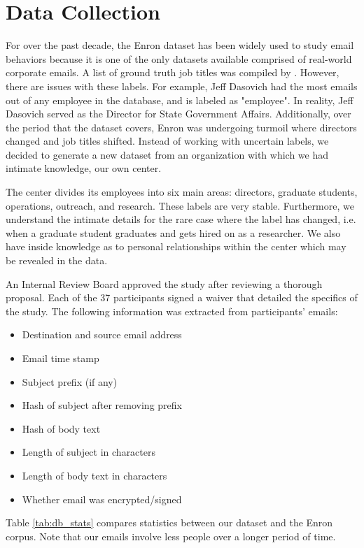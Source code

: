 \documentclass{article}
\begin{document}
\section{Data Collection} \label{Data Collection}
For over the past decade, the Enron dataset has been widely used to study email behaviors because it is one of the only datasets available comprised of real-world corporate emails.  A list of ground truth job titles was compiled by \cite{shetty_status_2004}.  However, there are issues with these labels.  For example, Jeff Dasovich had the most emails out of any employee in the database, and is labeled as "employee".  In reality, Jeff Dasovich served as the Director for State Government Affairs. Additionally, over the period that the dataset covers, Enron was undergoing turmoil where directors changed and job titles shifted.  Instead of working with uncertain labels, we decided to generate a new dataset from an organization with which we had intimate knowledge, our own center.  
\par
The center divides its employees into six main areas: directors, graduate students, operations, outreach, and research.  These labels are very stable.  Furthermore, we understand the intimate details for the rare case where the label has changed, i.e. when a graduate student graduates and gets hired on as a researcher. We also have inside knowledge as to personal relationships within the center which may be revealed in the data.
\par 
An Internal Review Board approved the study after reviewing a thorough proposal.  Each of the 37 participants signed a waiver that detailed the specifics of the study.   The following information was extracted from participants' emails:  
\begin{itemize}
\item Destination and source email address
\item Email time stamp
\item Subject prefix (if any)
\item Hash of subject after removing prefix
\item Hash of body text
\item Length of subject in characters
\item Length of body text in characters
\item Whether email was encrypted/signed
\end{itemize}
Table \ref{tab:db_stats} compares statistics between our dataset and the Enron corpus.  Note that our emails involve less people over a longer period of time.  
\end{document}
